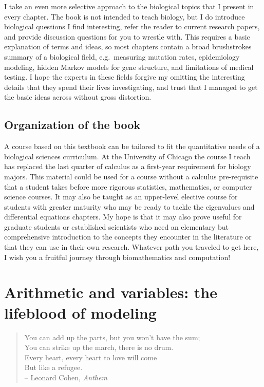 \documentclass[
]{book}
\begin{document}
I take an even more selective approach to the biological topics that I present in every chapter. The book is not intended to teach biology, but I do introduce biological questions I find interesting, refer the reader to current research papers, and provide discussion questions for you to wrestle with. This requires a basic explanation of terms and ideas, so most chapters contain a broad brushstrokes summary of a biological field, e.g.~measuring mutation rates, epidemiology modeling, hidden Markov models for gene structure, and limitations of medical testing. I hope the experts in these fields forgive my omitting the interesting details that they spend their lives investigating, and trust that I managed to get the basic ideas across without gross distortion.

\hypertarget{organization-of-the-book}{%
\section{Organization of the book}\label{organization-of-the-book}}

A course based on this textbook can be tailored to fit the quantitative needs of a biological sciences curriculum. At the University of Chicago the course I teach has replaced the last quarter of calculus as a first-year requirement for biology majors. This material could be used for a course without a calculus pre-requisite that a student takes before more rigorous statistics, mathematics, or computer science courses. It may also be taught as an upper-level elective course for students with greater maturity who may be ready to tackle the eigenvalues and differential equations chapters. My hope is that it may also prove useful for graduate students or established scientists who need an elementary but comprehensive introduction to the concepts they encounter in the literature or that they can use in their own research. Whatever path you traveled to get here, I wish you a fruitful journey through biomathematics and computation!

\hypertarget{arithmetic-and-variables-the-lifeblood-of-modeling}{%
\chapter{Arithmetic and variables: the lifeblood of modeling}\label{arithmetic-and-variables-the-lifeblood-of-modeling}}

\begin{quote}
You can add up the parts, but you won't have the sum;\\
You can strike up the march, there is no drum.\\
Every heart, every heart to love will come\\
But like a refugee.\\
-- Leonard Cohen, \emph{Anthem}
\end{quote}
\end{document}
